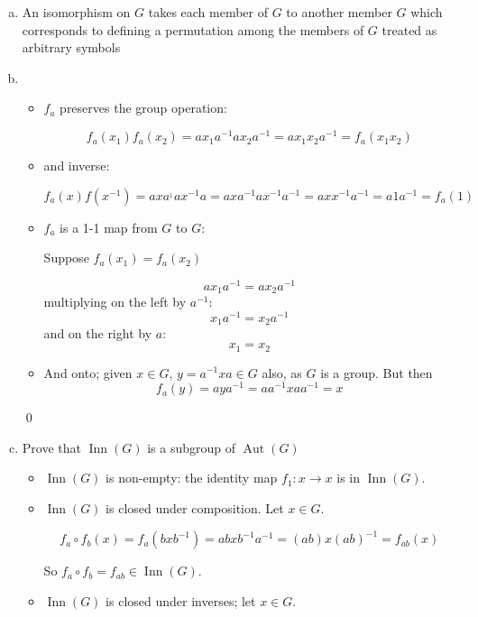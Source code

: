 \documentclass[11pt,oneside]{article}
\numberwithin{equation}{section}
\theoremstyle{definition}
\def\Aut{\operatorname{Aut}}
\def\Inn{\operatorname{Inn}}
\begin{document}
\begin{solution}
  \begin{enumerate}[(a)]
  \item
    An isomorphism on $G$ takes each member of $G$ to another member $G$ which corresponds to defining a permutation among the members of $G$ treated as arbitrary symbols
  \item
    \begin{itemize}
    \item
      $f_a$ preserves the group operation:
      
      $$
      f_a(x_1) f_a(x_2) = a x_1 a^{-1} a x_2 a ^{-1} = a x_1 x_2 a^ {-1} = f_a ( x_1 x_2 )
      $$
    \item
      and inverse:
      
      $$
      f_a(x) f(x ^ {-1}) = a x a^ { _1} a x ^ {-1} a = a x a ^ {-1} a x ^ {-1} a ^ {-1} = a x x ^ {-1} a ^ {-1} = a 1 a ^{-1} = f_a(1)
      $$
      
    \item
      $f_a$ is a 1-1 map from $G$ to $G$:
      
      Suppose $f_a(x_1) = f_a(x_2)$
      
      $$
      a x_1 a^ {-1} = a x_2 a ^ {-1}
      $$
      multiplying on the left by $a^{-1}$:
      $$
      x_1 a^ {-1} = x_2 a ^ {-1}
      $$
      and on the right by $a$:
      $$
      x_1 = x_2
      $$
    \item
      And onto; given $x \in G$, $ y= a^ {-1} x a \in G$ also, as $G$ is a group.
      But then
      $$
      f_a(y) = a y a ^ {-1} = a a ^ {-1} x a a ^ {-1} = x
      $$
    \end{itemize}
    \qed
  \item
    Prove that $\Inn(G)$ is a subgroup of $\Aut(G)$
    \begin{itemize}
    \item
      $\Inn(G)$ is non-empty: the identity map $f_1 : x \to x$ is in $\Inn(G)$.
    \item
      $\Inn(G)$ is closed under composition.  Let $x \in G$.  
      
      $$
      f_a \circ f_b (x) = f_a(bxb^{-1}) = a b x b^{-1} a^{-1} = (ab) x (ab)^ {-1} = f_{ab} (x)
      $$
      
      So $f_a \circ f_b = f _ {ab} \in \Inn(G)$.
      
    \item
      $\Inn(G)$ is closed under inverses; let $x \in G$.
      

\end{itemize}
\end{enumerate}
\end{solution}
\end{document}
